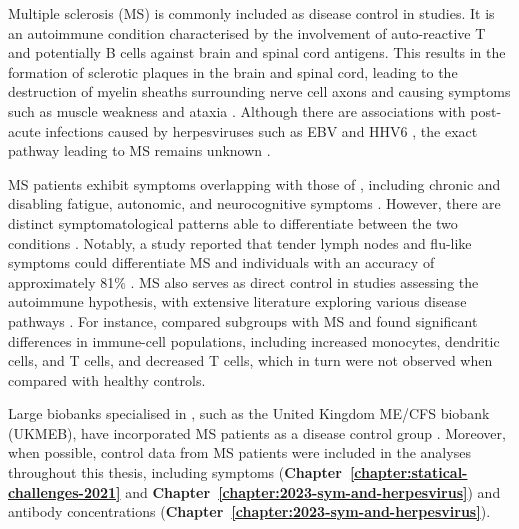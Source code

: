 Multiple sclerosis (MS) is commonly included as disease control in \cfs studies.
It is an autoimmune condition characterised by the involvement of auto-reactive T and potentially B cells against brain and spinal cord antigens.
This results in the formation of sclerotic plaques in the brain and spinal cord, leading to the destruction of myelin sheaths surrounding nerve cell axons and causing symptoms such as muscle weakness and ataxia \citep{janeway2017Immunology, dobson2019MultipleSclerosis}.
Although there are associations with post-acute infections caused by herpesviruses such as EBV \citep{wang2020HLADR15Molecules, bjornevik2022LongitudinalAnalysis} and HHV6 \citep{engdahl2019IncreasedSerological}, the exact pathway leading to MS remains unknown \citep{sedighi2022ComprehensiveInvestigations}.

MS patients exhibit symptoms overlapping with those of \cfs, including chronic and disabling fatigue, autonomic, and neurocognitive symptoms \citep{morrisMyalgicEncephalomyelitisChronic2013, gaberMultipleSclerosisChronic2014}.
However, there are distinct symptomatological patterns able to differentiate between the two conditions \citep{jasonDifferentiatingMultipleSclerosis2017, domingues2023AssociationAnalysis}.
Notably, a study reported that tender lymph nodes and flu-like symptoms could differentiate MS and \cfs individuals with an accuracy of approximately 81\% \citep{ohanian2016IdentifyingKey}.
MS also serves as direct control in \cfs studies assessing the autoimmune hypothesis, with extensive literature exploring various disease pathways \citep{ramosRegulatoryNaturalKiller2016, jain2017PrevalenceRisk, cliff2019CellularImmune, melvin2019CirculatingLevels, lacerda2019HopeDisappointment}.
For instance, \citet{cliff2019CellularImmune} compared \cfs subgroups with MS and found significant differences in immune-cell populations, including increased monocytes, dendritic cells, and \cdfour T cells, and decreased \cdeight T cells, which in turn were not observed when compared with healthy controls.

Large biobanks specialised in \cfs, such as the United Kingdom ME/CFS biobank (UKMEB), have incorporated MS patients as a disease control group \citep{lacerda2017UKME, lacerda2018UKME}.
Moreover, when possible, control data from MS patients were included in the analyses throughout this thesis, including symptoms (\textbf{Chapter~\ref{chapter:statical-challenges-2021}} and \textbf{Chapter~\ref{chapter:2023-sym-and-herpesvirus}}) and antibody concentrations (\textbf{Chapter~\ref{chapter:2023-sym-and-herpesvirus}}).

